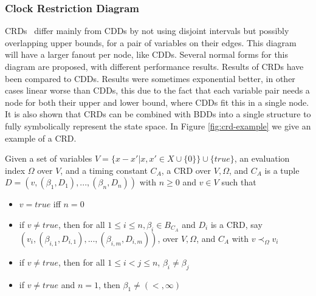 \subsubsection{Clock Restriction Diagram}
CRDs~\cite{crds} differ mainly from CDDs by not using disjoint intervals but possibly overlapping upper bounds, for a pair of variables on their edges. This diagram will have a larger fanout per node, like CDDs. Several normal forms for this diagram are proposed, with different performance results. Results of CRDs have been compared to CDDs. Results were sometimes exponential better, in other cases linear worse than CDDs, this due to the fact that each variable pair needs a node for both their upper and lower bound, where CDDs fit this in a single node. It is also shown that CRDs can be combined with BDDs into a single structure to fully symbolically represent the state space. In Figure \ref{fig:crd-example} we give an example of a CRD.
\begin{mydef}
Given a set of variables $V=\{x-x'|x,x'\in X \cup \{0\}\}\cup \{true\}$, an evaluation index $\Omega$ over $V$, and a timing constant $C_A$, a CRD over $V, \Omega$, and $C_A$ is a tuple $D = (v,(\beta_1,D_1),...,(\beta_n,D_n))$ with $n  \geq 0$ and $v \in V$ such that
\begin{itemize}
\item $v = true$ iff $n=0$
\item if $v \neq true$, then for all $1 \leq i \leq n, \beta_i \in B_{C_A}$ and $D_i$ is a CRD, say $(v_i,(\beta_{i,1},D_{i,1}),...,(\beta_{i,m},D_{i,m}))$, over $V, \Omega$, and $C_A$ with $v \prec_\Omega v_i$
\item if $v \neq true$, then for all $1 \leq i < j \leq n$, $\beta_i \neq \beta_j$
\item if $v \neq true$ and $n = 1$, then $\beta_1 \neq (<,\infty)$
\end{itemize}
\end{mydef}

